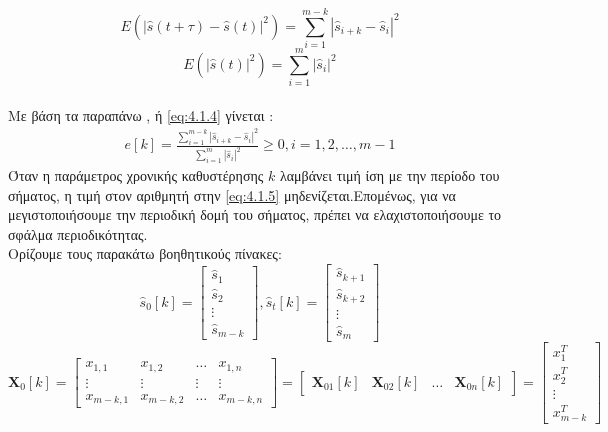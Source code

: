  $$
 Ε(\left | \hat{s}(t+\tau) - \hat{s}(t) \right |^2) = \sum_{i=1}^{m-k}
 \left | \hat{s}_{i+k} - \hat{s}_i  \right |^2
$$
$$
 E(\left | \hat{s}(t) \right |^2 ) = \sum_{i=1}^{m} \left | \hat{s}_i \right |^2
 $$
 \\
 Με βάση τα παραπάνω , ή \eqref{eq:4.1.4} γίνεται \cite{piCA:12}:
 \begin{align} \label{eq:4.1.5}
 e[k] = \frac{\sum\limits_{i=1}^{m-k}
 \left | \hat{s}_{i+k} - \hat{s}_i  \right |^2}{\sum\limits_{i=1}^{m} \left | \hat{s}_i \right |^2} \geq 0 , i = 1,2,\ldots,m-1
 \end{align}
 Όταν η παράμετρος χρονικής καθυστέρησης $k$ λαμβάνει τιμή ίση με την περίοδο του σήματος, η τιμή στον αριθμητή στην \eqref{eq:4.1.5} μηδενίζεται.Επομένως, για να μεγιστοποιήσουμε την περιοδική δομή του σήματος, πρέπει να ελαχιστοποιήσουμε το σφάλμα περιοδικότητας.
 \\
Ορίζουμε τους παρακάτω βοηθητικούς πίνακες:
$$
 \hat{s}_0[k]=\begin{bmatrix} 
                \hat{s}_1\\\hat{s}_2\\\vdots\\\hat{s}_{m-k}
                \end{bmatrix} , 
 \hat{s}_t[k] = \begin{bmatrix} 
                \hat{s}_{k+1} \\ \hat{s}_{k+2} \\ \vdots \\ \hat{s}_{m}
                \end{bmatrix}
$$
$$
 \mathbf{X}_{0}[k] = \begin{bmatrix} 
                x_{1,1}&x_{1,2}&\ldots&x_{1,n} \\
                \vdots&\vdots&\vdots&\vdots \\
                x_{m-k,1}&x_{m-k,2}&\ldots&x_{m-k,n}
                \end{bmatrix} = 
                \begin{bmatrix}
                \mathbf{X}_{01}[k] & \mathbf{X}_{02}[k] & \ldots & 
                \mathbf{X}_{0n}[k]
                \end{bmatrix} =
                \begin{bmatrix}
                x_1^T \\ x_2^T \\ \vdots \\ x_{m-k}^T
                \end{bmatrix}
$$
